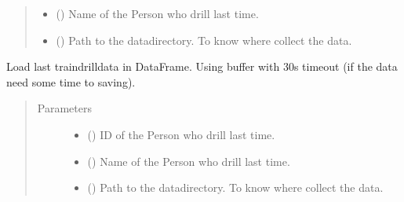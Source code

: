 \documentclass[letterpaper,10pt,english]{sphinxmanual}
\begin{document}
\begin{fulllineitems}
\begin{fulllineitems}
\begin{quote}
\begin{description}
\begin{itemize}
\item {} 
\sphinxAtStartPar
{} () \textendash{} Name of the Person who drill last time.

\item {} 
\sphinxAtStartPar
{} () \textendash{} Path to the data\sphinxhyphen{}directory. To know where collect the data.

\end{itemize}

\end{description}\end{quote}

\end{fulllineitems}


\begin{fulllineitems}
\label{\detokenize{anoog.automation:anoog.automation.ai_model.AI_Model.add_train_dataset}}
\sphinxAtStartPar
Load last train\sphinxhyphen{}drill\sphinxhyphen{}data in DataFrame. Using buffer with 30s timeout (if the data need some time to saving).
\begin{quote}\begin{description}
\item[{Parameters}] \leavevmode\begin{itemize}
\item {} 
\sphinxAtStartPar
{} () \textendash{} ID of the Person who drill last time.

\item {} 
\sphinxAtStartPar
{} () \textendash{} Name of the Person who drill last time.

\item {} 
\sphinxAtStartPar
{} () \textendash{} Path to the data\sphinxhyphen{}directory. To know where collect the data.


\end{itemize}
\end{description}
\end{quote}
\end{fulllineitems}
\end{fulllineitems}
\end{document}
